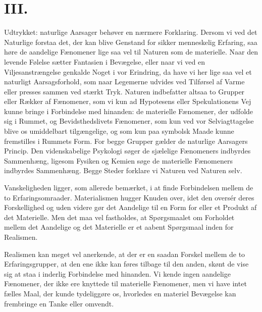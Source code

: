 \documentclass[12pt,a4paper]{article}
\newcommand{\opage}[1]{\marginnote{\footnotesize\textit{[#1]}}}
\begin{document}
\section*{III.}

Udtrykket: naturlige Aarsager behøver en nærmere Forklaring. Dersom vi
ved det Naturlige forstaa det, der kan blive Genstand for sikker
menneskelig Erfaring, saa høre de aandelige Fænomener lige saa vel til
Naturen som de materielle. Naar den levende Følelse sætter Fantasien i
Bevægelse, eller naar vi ved en Viljesanstrængelse genkalde Noget i vor
Erindring, da have vi her lige saa vel et naturligt Aarsagsforhold, som
naar Legemerne udvides ved Tilførsel af Varme eller presses sammen ved
stærkt Tryk. Naturen indbefatter altsaa to Grupper eller Rækker af
Fænomener, som vi kun ad Hypotesens eller Spekulationens Vej kunne
bringe i Forbindelse med hinanden: de materielle Fænomener, der udfolde
sig i Rummet, og Bevidsthedslivets Fænomener, som kun ved vor
Selviagttagelse blive os umiddelbart tilgængelige, og som kun paa
symbolsk Maade kunne fremstilles i Rummets Form. For begge Grupper
gælder de naturlige Aarsagers Princip. Den videnskabelige Psykologi
søger de sjælelige Fænomeners indbyrdes Sammenhæng, ligesom Fysiken og
Kemien søge de materielle Fænomeners indbyrdes Sammenhæng. Begge Steder
forklare vi Naturen ved Naturen selv.

Vanskeligheden ligger, som allerede bemærket, i at finde Forbindelsen
mellem de to Erfaringsomraader. Materialismen hugger Knuden over, idet
den oversér deres Forskellighed og uden videre gør det Aandelige til en
Form for eller et Produkt af det Materielle. Men det maa vel fastholdes,
at
\opage{8}Spørgsmaalet om Forholdet mellem det Aandelige og det Materielle er
et aabent Spørgsmaal inden for Realismen.

Realismen kan meget vel anerkende, at der er en saadan Forskel mellem
de to Erfaringsgrupper, at den ene ikke kan føres tilbage til den anden,
skønt de vise sig at staa i inderlig Forbindelse med hinanden. Vi kende
ingen aandelige Fænomener, der ikke ere knyttede til materielle
Fænomener, men vi have intet fælles Maal, der kunde tydeliggøre os,
hvorledes en materiel Bevægelse kan frembringe en Tanke eller omvendt.
\end{document}
